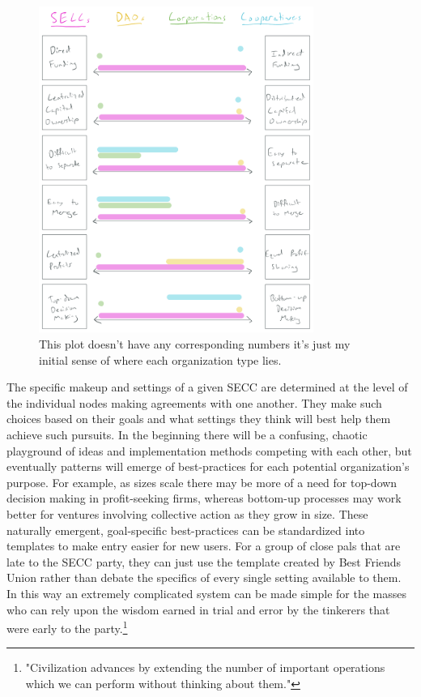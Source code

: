 \documentclass{article}[10pt]
\begin{document}
\begin{figure}[!ht]
    \centering
    \includegraphics[width = 0.8\textwidth]{figures/IMG_BB0DCC4686FC-1.jpeg}
    \caption{This plot doesn't have any corresponding numbers it's just my initial sense of where each organization type lies.}
    \label{fig:variation}
\end{figure}

The specific makeup and settings of a given SECC are determined at the level of the individual nodes making agreements with one another.
They make such choices based on their goals and what settings they think will best help them achieve such pursuits. 
In the beginning there will be a confusing, chaotic playground of ideas and implementation methods competing with each other, but eventually patterns will emerge of best-practices for each potential organization's purpose.
For example, as sizes scale there may be more of a need for top-down decision making in profit-seeking firms, whereas bottom-up processes may work better for ventures involving collective action as they grow in size.
These naturally emergent, goal-specific best-practices can be standardized into templates to make entry easier for new users.
For a group of close pals that are late to the SECC party, they can just use the template created by Best Friends Union rather than debate the specifics of every single setting available to them.
In this way an extremely complicated system can be made simple for the masses who can rely upon the wisdom earned in trial and error by the tinkerers that were early to the party.\footnote{
    "Civilization advances by extending the number of important operations which we can perform without thinking about them."
    }
\end{document}
